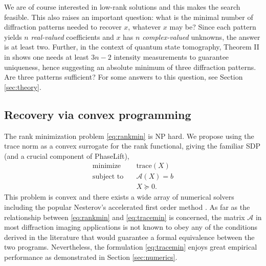 \documentclass[11pt]{article}
\newcommand{\<}{\langle}
\renewcommand{\>}{\rangle}
\newcommand{\cA}{\mathcal{A}}
\numberwithin{equation}{section}
\newcommand{\new}[1]{\textcolor{red}{#1}}
\begin{document}
We are of course interested in low-rank solutions and this makes the
search feasible. This also raises an important question: what is the
minimal number of diffraction patterns needed to recover $x$, whatever
$x$ may be? Since each pattern yields $n$ {\em real-valued}
coefficients and $x$ has $n$ {\em complex-valued} unknowns, the answer
is at least two. Further, in the context of quantum state tomography,
Theorem II in \cite{Fin04} shows one needs at least $3n-2$ intensity
measurements to guarantee uniqueness, hence suggesting an absolute
minimum of three diffraction patterns. Are three patterns sufficient?
For some answers to this question, see Section \ref{sec:theory}.


\subsection{Recovery via convex programming}

The rank minimization problem \eqref{eq:rankmin} is NP hard. 
We propose using the trace norm as a convex surrogate
\cite{Beck98,Mesbahi97} for the rank functional, giving the familiar
SDP (and a crucial component of PhaseLift),
\begin{equation}
\label{eq:tracemin}
 \begin{array}{ll}
    \text{minimize}   & \quad \text{trace}(X)\\ 
    \text{subject to} & \quad  \cA(X) = b\\
& \quad X \succeq 0. 
\end{array}
\end{equation}
This problem is convex and there exists a wide array of numerical
solvers including the popular Nesterov's accelerated first order
method \cite{NesterovBook}. As far as the relationship between
\eqref{eq:rankmin} and \eqref{eq:tracemin} is concerned, the matrix
$\cA$ in most diffraction imaging applications is not known to obey
any of the conditions derived in the literature
\cite{CR08,CT09,Recht07} that would guarantee a formal equivalence
between the two programs. Nevertheless, the formulation
\eqref{eq:tracemin} enjoys great empirical performance as demonstrated
in Section \ref{sec:numerics}.
\end{document}
